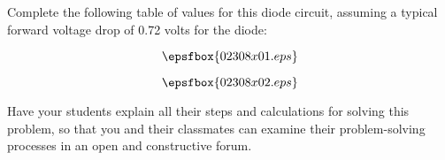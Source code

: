 

Complete the following table of values for this diode circuit, assuming a typical forward voltage drop of 0.72 volts for the diode:

$$\epsfbox{02308x01.eps}$$







$$\epsfbox{02308x02.eps}$$







Have your students explain all their steps and calculations for solving this problem, so that you and their classmates can examine their problem-solving processes in an open and constructive forum.




